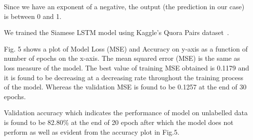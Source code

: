 \documentclass[runningheads]{llncs}
\begin{document}
	\begin{minipage}{\linewidth}
		\begin{center}
		\end{center}
	\end{minipage}
	\afterpage{\clearpage}
	
	Since we have an exponent of a negative, the output (the prediction in our case) is between 0 and 1.
	
	We trained the Siamese LSTM model using Kaggle's Quora Pairs dataset~\cite{ref_url25}. 	
	
	Fig. 5 shows a plot of Model Loss (MSE) and Accuracy on y-axis as a function of number of epochs on the x-axis.
	The mean squared error (MSE) is the same as loss measure of the model. The best value of training MSE obtained is 0.1179 and it is found to be decreasing at a decreasing rate throughout the training process of the model. Whereas the validation MSE is found to be 0.1257 at the end of 30 epochs.
	
	Validation accuracy which indicates the performance of model on unlabelled data is found to be 82.80\% at the end of 20 epoch after which the model does not perform as well as evident from the accuracy plot in Fig.5.
	
\end{document}
